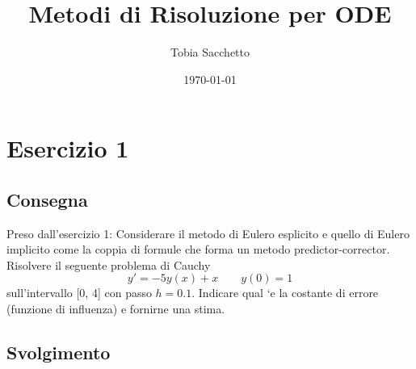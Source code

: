 \documentclass[11pt]{article}
\begin{document}
\title{Metodi di Risoluzione per ODE}

\author{Tobia Sacchetto}
\date{\today}
\maketitle

\section{Esercizio 1}
\subsection{Consegna}
Preso dall'esercizio 1: Considerare il metodo di Eulero esplicito e quello di Eulero implicito come la coppia di formule che forma un metodo predictor-corrector. Risolvere il seguente problema di Cauchy
\[
y'=-5y(x)+x \qquad y(0)=1
\]
sull’intervallo [0, 4] con passo $h = 0.1$. Indicare qual `e la costante di errore
(funzione di influenza) e fornirne una stima.

\subsection{Svolgimento}
\end{document}
